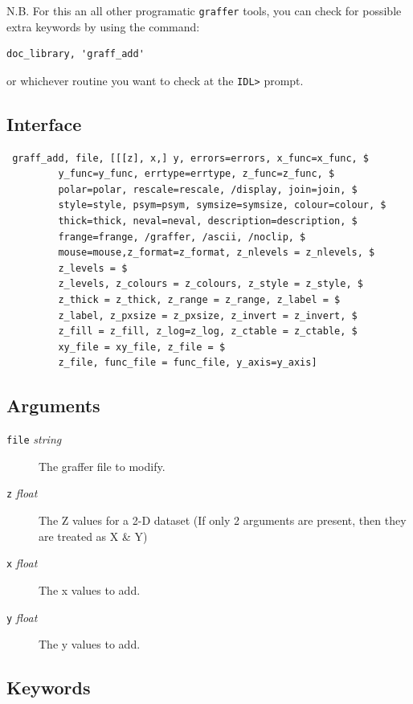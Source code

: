 \documentclass[11pt,twoside,english]{article}
\begin{document}
N.B. For this an all other programatic \texttt{graffer} tools, you can
check for possible extra keywords by using the command:
\begin{verbatim}
doc_library, 'graff_add'
\end{verbatim}
or whichever routine you want to check at the \texttt{IDL>} prompt.

\subsection{Interface}

\begin{verbatim}
 graff_add, file, [[[z], x,] y, errors=errors, x_func=x_func, $
         y_func=y_func, errtype=errtype, z_func=z_func, $
         polar=polar, rescale=rescale, /display, join=join, $
         style=style, psym=psym, symsize=symsize, colour=colour, $
         thick=thick, neval=neval, description=description, $
         frange=frange, /graffer, /ascii, /noclip, $
         mouse=mouse,z_format=z_format, z_nlevels = z_nlevels, $
         z_levels = $ 
         z_levels, z_colours = z_colours, z_style = z_style, $
         z_thick = z_thick, z_range = z_range, z_label = $
         z_label, z_pxsize = z_pxsize, z_invert = z_invert, $
         z_fill = z_fill, z_log=z_log, z_ctable = z_ctable, $
         xy_file = xy_file, z_file = $
         z_file, func_file = func_file, y_axis=y_axis]
\end{verbatim}

\subsection{Arguments}

\begin{description}
\item[\texttt{file} \textit{string}] The graffer file to modify.
\item[\texttt{z} \textit{float}] The Z values for a 2-D dataset (If
  only 2 arguments are present, then they are treated as X \& Y)
\item[\texttt{x} \textit{float}] The x values to add.
\item[\texttt{y} \textit{float}] The y values to add.
\end{description}



\subsection{Keywords}
\end{document}
